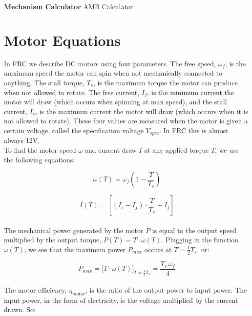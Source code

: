 \documentclass[a4paper]{article}
\begin{document}
	
	\Huge\textbf{Mechanism Calculator}
	\newline
	\LARGE AMB Calculator
	
	\vspace{0.5cm}
	\normalsize
	
	\section{Motor Equations}
	
	In FRC we describe DC motors using four parameters. The free speed, $ \omega_f $, is the maximum speed the motor can spin when not mechanically connected to anything. The stall torque, $ T_s $, is the maximum torque the motor can produce when not allowed to rotate. The free current, $ I_f $, is the minimum current the motor will draw (which occurs when spinning at max speed), and the stall current, $ I_s $, is the maximum current the motor will draw (which occurs when it is not allowed to rotate). These four values are measured when the motor is given a certain voltage, called the specification voltage $ V_{spec} $. In FRC this is almost always 12V. \\
	
	To find the motor speed $ \omega $ and current draw $ I $ at any applied torque $ T $, we use the following equations:
	
	\begin{equation} \label{w(T)}
		\omega (T) = \omega_f \left( 1 - \frac{T}{T_s} \right)
	\end{equation}
	
	\begin{equation} \label{I(T)}
		I (T) = \left[ \left( I_s - I_f \right) \cdot \frac{T}{T_s} + I_f \right]
	\end{equation}\\
	
	The mechanical power generated by the motor $ P $ is equal to the output speed multiplied by the output torque, $ P(T) = T \cdot \omega (T) $. Plugging in the function $ \omega (T) $, we see that the maximum power $ P_{max} $ occurs at $ T = \frac{1}{2} T_s $, or:
	
	\begin{equation}
		P_{max} = \Big[ T \cdot \omega(T) \Big]_{T = \frac{1}{2} T_s} = \frac{T_s\, \omega_f}{4}
	\end{equation}\\
	
	The motor efficiency, $ \eta_{motor} $, is the ratio of the output power to input power. The input power, in the form of electricity, is the voltage multiplied by the current drawn. So:
	
\end{document}
